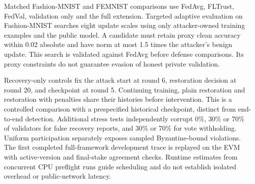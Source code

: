 Matched Fashion-MNIST and FEMNIST comparisons use FedAvg, FLTrust, FedVal,
validation only and the full extension. Targeted adaptive evaluation on
Fashion-MNIST searches eight update scales using only attacker-owned training
examples and the public model. A candidate must retain proxy clean accuracy
within 0.02 absolute and have norm at most 1.5 times the attacker's benign update.
This search is validated against FedAvg before defense comparisons. Its proxy
constraints do not guarantee evasion of honest private validation.

Recovery-only controls fix the attack start at round 6, restoration decision at
round 20, and checkpoint at round 5. Continuing training, plain restoration and
restoration with penalties share their histories before intervention. This is a
controlled comparison with a prespecified historical checkpoint, distinct from
end-to-end detection. Additional stress tests independently corrupt 0\%, 30\%
or 70\% of validators for false recovery reports, and 30\% or 70\% for vote
withholding. Uniform participation separately exposes sampled Byzantine-bound
violations. The first completed full-framework development trace is replayed on
the EVM with active-version and final-stake agreement checks. Runtime estimates
from concurrent CPU preflight runs guide scheduling and do not establish
isolated overhead or public-network latency.
